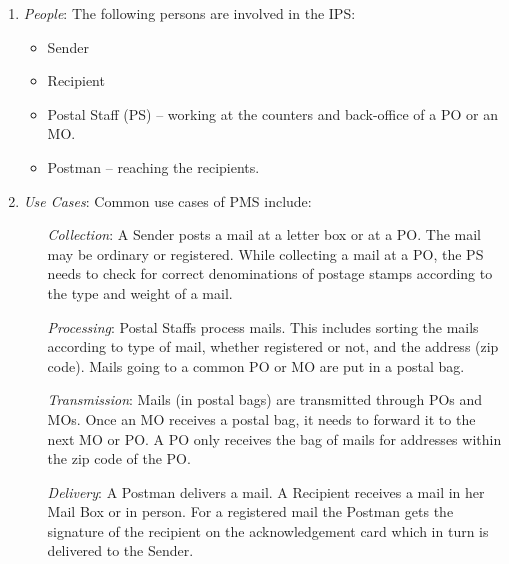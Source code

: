 \documentclass{article}
\begin{document}
\begin{enumerate}
\begin{enumerate}
\begin{itemize}
\end{itemize}

\item {\em People}: The following persons are involved in the IPS:

\begin{itemize}
\item Sender
\item Recipient
\item Postal Staff (PS) -- working at the counters and back-office of a PO or an MO.
\item Postman -- reaching the recipients.
\end{itemize}

\item {\em Use Cases}: Common use cases of PMS include:
\begin{itemize}
\item [{\em Collection}:] A Sender posts a mail at a letter box or at a PO. The mail may be ordinary or registered. While collecting a mail at a PO, the PS needs to check for correct denominations of postage stamps according to the type and weight of a mail.
\item [{\em Processing}:] Postal Staffs process mails. This includes sorting the mails according to type of mail, whether registered or not, and the address (zip code). Mails going to a common PO or MO are put in a postal bag. 
\item [{\em Transmission}:] Mails (in postal bags) are transmitted through POs and MOs. Once an MO receives a postal bag, it needs to forward it to the next MO or PO. A PO only receives the bag of mails for addresses within the zip code of the PO.
\item [{\em Delivery}:] A Postman delivers a mail. A Recipient receives a mail in her Mail Box or in person. For a registered mail the Postman gets the signature of the recipient on the acknowledgement card which in turn is delivered to the Sender.
\end{itemize}

\end{enumerate}


\end{enumerate}




\end{document}
